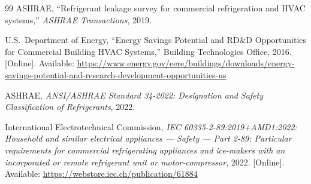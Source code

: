 \documentclass[11pt,a4paper]{article}
\begin{document}
\begin{thebibliography}{99}
ASHRAE, ``Refrigerant leakage survey for commercial refrigeration and HVAC systems,'' \emph{ASHRAE Transactions}, 2019.

U.S.~Department of Energy, ``Energy Savings Potential and RD\&D Opportunities for Commercial Building HVAC Systems,'' Building Technologies Office, 2016. [Online]. Available: \url{https://www.energy.gov/eere/buildings/downloads/energy-savings-potential-and-research-development-opportunities-us}

ASHRAE, \emph{ANSI/ASHRAE Standard 34-2022: Designation and Safety Classification of Refrigerants}, 2022.

International Electrotechnical Commission, \emph{IEC 60335-2-89:2019+AMD1:2022: Household and similar electrical appliances --- Safety --- Part 2-89: Particular requirements for commercial refrigerating appliances and ice-makers with an incorporated or remote refrigerant unit or motor-compressor}, 2022. [Online]. Available: \url{https://webstore.iec.ch/publication/61884}

\end{thebibliography}
\end{document}
